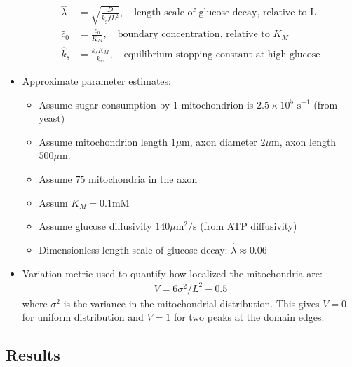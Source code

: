 \documentclass[12pt,letterpaper]{article}
\begin{document}
\begin{itemize}
	\begin{equation*}
	\begin{split}
	\hat{\lambda} & = \sqrt{\frac{D}{k_g f L^2}}, \quad \text{length-scale of glucose decay, relative to L} \\
	\hat{c}_0 & = \frac{c_0}{K_M}, \quad \text{boundary concentration, relative to $K_M$} \\
	\hat{k}_s & = \frac{k_s K_M}{k_w}, \quad \text{equilibrium stopping constant at high glucose}
	\end{split}
	\end{equation*}
	\item Approximate parameter estimates:
	\begin{itemize}
		\item Assume sugar consumption by 1 mitochondrion is $2.5\times 10^5\text{ s}^{-1}$ (from yeast)
		\item Assume mitochondrion length $1\mu$m, axon diameter $2\mu$m, axon length $500\mu\text{m}$.
		\item Assume $75$ mitochondria in the axon
		\item Assum $K_M = 0.1$mM
		\item Assume glucose diffusivity $140\mu\text{m}^2/\text{s}$ (from ATP diffusivity)
		\item Dimensionless length scale of glucose decay: $\hat{\lambda} \approx 0.06$	
	\end{itemize}
	\item Variation metric used to quantify how localized the mitochondria are:
	\begin{equation*}
	\begin{split}
	V = 6 \sigma^2/L^2 - 0.5
	\end{split}
	\end{equation*}
	where $\sigma^2$ is the variance in the mitochondrial distribution. This gives $V=0$ for uniform distribution and $V=1$ for two peaks at the domain edges.
\end{itemize}

\subsection{Results}



\renewcommand\refname{\vspace{-\baselineskip}}

\begin{multicols}{2}
	
\footnotesize
{}

%

\end{multicols}
\end{document}
